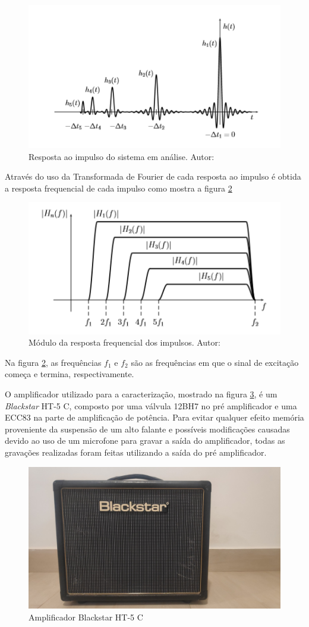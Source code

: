 \begin{figure}
	\centering
	\includegraphics[width=0.6\linewidth]{figuras/NLCIR}
	\caption{Resposta ao impulso do sistema em análise. Autor: \cite{novakdissertation}}
	\label{fig:nlcir}
\end{figure}

Através do uso da Transformada de Fourier de cada resposta ao impulso é obtida a resposta frequencial de cada impulso como mostra a figura \ref{fig:nlcfr}
\begin{figure}
	\centering
	\includegraphics[width=0.6\linewidth]{figuras/NLCFR}
	\caption{Módulo da resposta frequencial dos impulsos. Autor:\cite{novakdissertation}}
	\label{fig:nlcfr}
\end{figure}

Na figura \ref{fig:nlcfr}, as frequências $f_{1}$ e $f_{2}$ são as frequências em que o sinal de excitação começa e termina, respectivamente.


O amplificador utilizado para a caracterização, mostrado na figura \ref{fig:Black}, é um \textit{Blackstar} HT-5 C, composto por uma válvula 12BH7 no pré amplificador e uma ECC83 na parte de amplificação de potência. Para evitar qualquer efeito memória proveniente da suspensão de um alto falante \cite{klippel2004dynamical} e possíveis modificações causadas devido ao uso de um microfone para gravar a saída do amplificador, todas as gravações realizadas foram feitas utilizando a saída do pré amplificador.

\begin{figure}
	\centering
	\includegraphics[width=0.7 \linewidth]{figuras/Blackstar1}
	\caption{Amplificador Blackstar HT-5 C}
	\label{fig:Black}
\end{figure}

